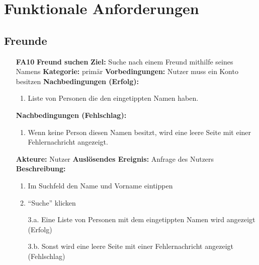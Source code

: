 \documentclass[parskip=full]{scrartcl}
\begin{document}
	\newpage
	\section{Funktionale Anforderungen}
		\subsection{Freunde}
		\begin{itemize}[nosep]
			\item[\textbf{FA10}]\textbf{Freund suchen}
			\newline\newline \textbf{Ziel:} Suche nach einem Freund mithilfe seines Namens
			\newline \textbf{Kategorie:} primär
			\newline \textbf{Vorbedingungen:} Nutzer muss ein Konto besitzen
			\newline \textbf{Nachbedingungen (Erfolg):} 
			\begin{enumerate}[nosep]
				\item Liste von Personen die den eingetippten Namen haben.
			\end{enumerate}
			\textbf{Nachbedingungen (Fehlschlag):} 
			\begin{enumerate}[nosep]
				\item Wenn keine Person diesen Namen besitzt, wird eine leere Seite mit einer Fehlernachricht angezeigt.
			\end{enumerate}  
			\textbf{Akteure:} Nutzer
			\newline \textbf{Auslösendes Ereignis:} Anfrage des Nutzers
			\newline \textbf{Beschreibung:}
				\begin{enumerate}[nosep]
					\item Im Suchfeld den Name und Vorname eintippen
					\item “Suche” klicken
					\item[3.a.] Eine Liste von Personen mit dem eingetippten Namen wird angezeigt (Erfolg)
					\item[3.b.] Sonst wird eine leere Seite mit einer Fehlernachricht angezeigt (Fehlschlag) \\
				\end{enumerate}
			

\end{itemize}
\end{document}
